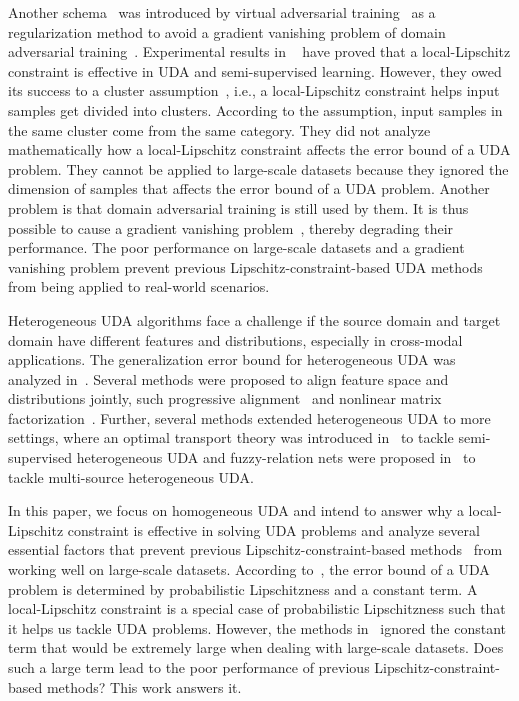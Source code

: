 \documentclass[journal,twocolumn]{IEEEtran}
\theoremstyle{definition}
\begin{document}
Another schema~\cite{shu2018a} was introduced by virtual adversarial training~\cite{miyato2018virtual} as a regularization method to avoid a gradient vanishing problem of domain adversarial training~\cite{8833506}. Experimental results in 
~\cite{shu2018a,miyato2018virtual,mao2019virtual}
have proved that a local-Lipschitz constraint is effective in UDA and semi-supervised learning. However, they owed its success to a cluster assumption~\cite{grandvalet2004semi-supervised}, i.e.,  a local-Lipschitz constraint helps input samples get divided into clusters. According to the assumption, input samples in the same cluster come from the same category. They did not analyze mathematically how a local-Lipschitz constraint affects the error bound of  a UDA problem. They cannot be applied to large-scale datasets because they ignored the dimension of samples that affects  the error bound of  a UDA problem.  Another problem is that domain adversarial training is still used by them. It is thus possible to cause a gradient vanishing problem~\cite{8833506}, thereby degrading their performance.  The poor performance on large-scale datasets and a gradient vanishing problem prevent previous Lipschitz-constraint-based UDA methods from being applied to real-world scenarios.

Heterogeneous UDA algorithms face a challenge if the source domain and target domain have different features and distributions, especially in cross-modal applications. The generalization error bound for heterogeneous UDA was analyzed in~\cite{JMLR:v20:13-580,9023553}. Several methods were proposed to align feature space and distributions jointly, such progressive alignment~\cite{8475006} and nonlinear matrix factorization~\cite{8725935}. Further, several methods extended  heterogeneous UDA to more settings, where an optimal transport theory was introduced in~\cite{ijcai2018-412} to tackle semi-supervised heterogeneous UDA and fuzzy-relation nets were proposed in~\cite{9172137} to tackle multi-source heterogeneous UDA.

In this paper, we focus on homogeneous UDA and intend to answer why a local-Lipschitz constraint is effective in solving UDA problems and analyze several essential factors that prevent previous Lipschitz-constraint-based methods~\cite{shu2018a,mao2019virtual} from working well on large-scale datasets. According to~\cite{Ben-David2014}, the error bound of a UDA problem is determined by probabilistic Lipschitzness and a constant term. A local-Lipschitz constraint is a special case of probabilistic Lipschitzness such that it helps us tackle UDA problems. However, the methods in~\cite{shu2018a,mao2019virtual} ignored the constant term that would be extremely large when dealing with large-scale datasets. Does such a large term lead to the poor performance of previous Lipschitz-constraint-based methods? This work answers it.
\end{document}
